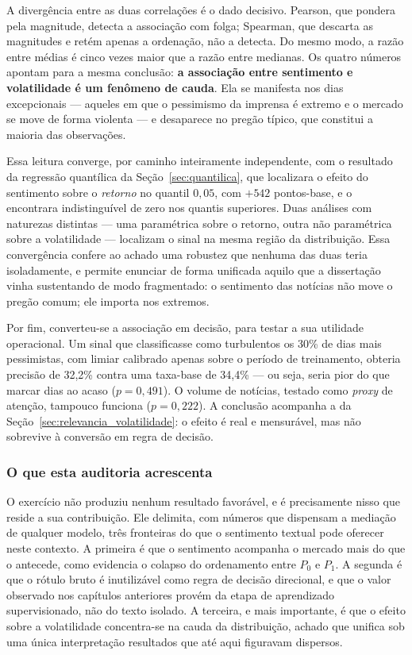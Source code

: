 A divergência entre as duas correlações é o dado decisivo. Pearson, que pondera pela magnitude,
detecta a associação com folga; Spearman, que descarta as magnitudes e retém apenas a ordenação, não a
detecta. Do mesmo modo, a razão entre médias é cinco vezes maior que a razão entre medianas. Os quatro
números apontam para a mesma conclusão: \textbf{a associação entre sentimento e volatilidade é um
fenômeno de cauda}. Ela se manifesta nos dias excepcionais --- aqueles em que o pessimismo da imprensa
é extremo e o mercado se move de forma violenta --- e desaparece no pregão típico, que constitui a
maioria das observações.

Essa leitura converge, por caminho inteiramente independente, com o resultado da regressão quantílica
da Seção~\ref{sec:quantilica}, que localizara o efeito do sentimento sobre o \emph{retorno} no quantil
$0{,}05$, com $+542$ pontos-base, e o encontrara indistinguível de zero nos quantis superiores. Duas
análises com naturezas distintas --- uma paramétrica sobre o retorno, outra não paramétrica sobre a
volatilidade --- localizam o sinal na mesma região da distribuição. Essa convergência confere ao achado
uma robustez que nenhuma das duas teria isoladamente, e permite enunciar de forma unificada aquilo
que a dissertação vinha sustentando de modo fragmentado: o sentimento das notícias não move o pregão
comum; ele importa nos extremos.

Por fim, converteu-se a associação em decisão, para testar a sua utilidade operacional. Um sinal que
classificasse como turbulentos os 30\% de dias mais pessimistas, com limiar calibrado apenas sobre o
período de treinamento, obteria precisão de 32,2\% contra uma taxa-base de 34,4\% --- ou seja, seria
pior do que marcar dias ao acaso ($p = 0{,}491$). O volume de notícias, testado como \textit{proxy} de
atenção, tampouco funciona ($p = 0{,}222$). A conclusão acompanha a da Seção~\ref{sec:relevancia_volatilidade}:
o efeito é real e mensurável, mas não sobrevive à conversão em regra de decisão.

\subsubsection{O que esta auditoria acrescenta}

O exercício não produziu nenhum resultado favorável, e é precisamente nisso que reside a sua
contribuição. Ele delimita, com números que dispensam a mediação de qualquer modelo, três fronteiras
do que o sentimento textual pode oferecer neste contexto. A primeira é que o sentimento acompanha o
mercado mais do que o antecede, como evidencia o colapso do ordenamento entre $P_0$ e $P_1$. A segunda
é que o rótulo bruto é inutilizável como regra de decisão direcional, e que o valor observado nos
capítulos anteriores provém da etapa de aprendizado supervisionado, não do texto isolado. A terceira,
e mais importante, é que o efeito sobre a volatilidade concentra-se na cauda da distribuição, achado
que unifica sob uma única interpretação resultados que até aqui figuravam dispersos.

